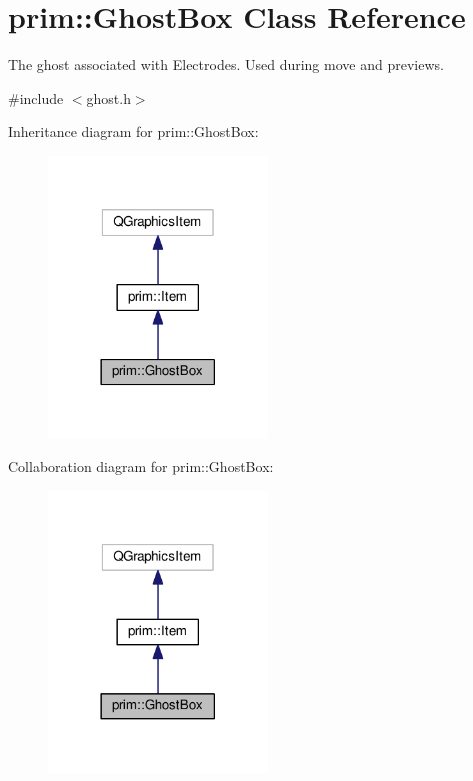 \hypertarget{classprim_1_1GhostBox}{}\section{prim\+:\+:Ghost\+Box Class Reference}
\label{classprim_1_1GhostBox}


The ghost associated with Electrodes. Used during move and previews.  




{\ttfamily \#include $<$ghost.\+h$>$}



Inheritance diagram for prim\+:\+:Ghost\+Box\+:\nopagebreak
\begin{figure}[H]
\begin{center}
\leavevmode
\includegraphics[width=165pt]{classprim_1_1GhostBox__inherit__graph}
\end{center}
\end{figure}


Collaboration diagram for prim\+:\+:Ghost\+Box\+:\nopagebreak
\begin{figure}[H]
\begin{center}
\leavevmode
\includegraphics[width=165pt]{classprim_1_1GhostBox__coll__graph}
\end{center}
\end{figure}
